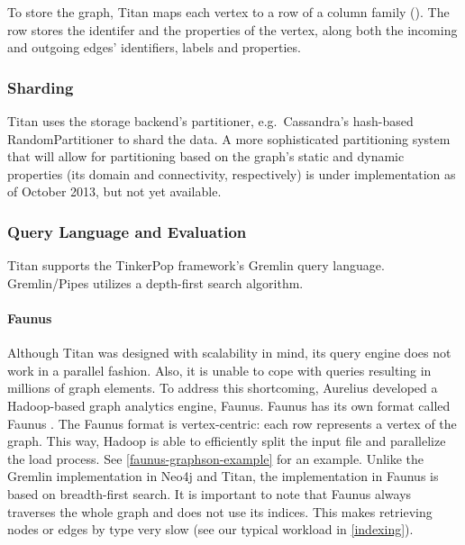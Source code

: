 
To store the graph, Titan maps each vertex to a row of a column family (). The row stores the identifer and the properties of the vertex, along both the incoming and outgoing edges' identifiers, labels and properties.

\subsubsection{Sharding}

Titan uses the storage backend's partitioner, e.g.\ Cassandra's hash-based RandomPartitioner to shard the data. A more sophisticated partitioning system that will allow for partitioning based on the graph's static and dynamic properties (its domain and connectivity, respectively) is under implementation as of October 2013, but not yet available.

\subsubsection{Query Language and Evaluation}

Titan supports the TinkerPop framework's Gremlin query language. Gremlin/Pipes utilizes a depth-first search algorithm.

\paragraph{Faunus}

Although Titan was designed with scalability in mind, its query engine does not work in a parallel fashion. Also, it is unable to cope with queries resulting in millions of graph elements. To address this shortcoming, Aurelius developed a Hadoop-based graph analytics engine, Faunus. Faunus has its own format called Faunus \graphson{}. The Faunus \graphson{} format is vertex-centric: each row represents a vertex of the graph. This way, Hadoop is able to efficiently split the input file and parallelize the load process. See \autoref{faunus-graphson-example} for an example. Unlike the Gremlin implementation in Neo4j and Titan, the implementation in Faunus is based on breadth-first search. It is important to note that Faunus always traverses the whole graph and does not use its indices. This makes retrieving nodes or edges by type very slow (see our typical workload in \autoref{indexing}).

